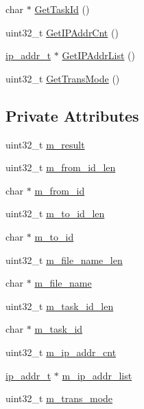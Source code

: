 \begin{DoxyCompactItemize}
\item 
char $\ast$ \hyperlink{class_c_im_pdu_client_file_response_a804f93cce58a8adc167049a30ffba377}{Get\+Task\+Id} ()
\item 
uint32\+\_\+t \hyperlink{class_c_im_pdu_client_file_response_aa64265ca09ef22d7d1e8d11eeb3ebcf6}{Get\+I\+P\+Addr\+Cnt} ()
\item 
\hyperlink{structip__addr__t}{ip\+\_\+addr\+\_\+t} $\ast$ \hyperlink{class_c_im_pdu_client_file_response_aab69ffaf90db3a83eb59c17a97dd725b}{Get\+I\+P\+Addr\+List} ()
\item 
uint32\+\_\+t \hyperlink{class_c_im_pdu_client_file_response_a48c941c039f2b3ac208db121ffa4831f}{Get\+Trans\+Mode} ()
\end{DoxyCompactItemize}
\subsection*{Private Attributes}
\begin{DoxyCompactItemize}
\item 
uint32\+\_\+t \hyperlink{class_c_im_pdu_client_file_response_a1ce5ec6b07086e4d8d725ab185188ec3}{m\+\_\+result}
\item 
uint32\+\_\+t \hyperlink{class_c_im_pdu_client_file_response_a00b534a883b0a19a6483a85ab091b872}{m\+\_\+from\+\_\+id\+\_\+len}
\item 
char $\ast$ \hyperlink{class_c_im_pdu_client_file_response_ae57497bb419857e27435597c7b3956e8}{m\+\_\+from\+\_\+id}
\item 
uint32\+\_\+t \hyperlink{class_c_im_pdu_client_file_response_ad1de68e049e316401d00a5436f41e200}{m\+\_\+to\+\_\+id\+\_\+len}
\item 
char $\ast$ \hyperlink{class_c_im_pdu_client_file_response_a4d6dc367e65513f0644892ef665c4cdd}{m\+\_\+to\+\_\+id}
\item 
uint32\+\_\+t \hyperlink{class_c_im_pdu_client_file_response_a9e9b90607ebdb053476c291d194e58e1}{m\+\_\+file\+\_\+name\+\_\+len}
\item 
char $\ast$ \hyperlink{class_c_im_pdu_client_file_response_ada652da5d3b018688408f1439c7db518}{m\+\_\+file\+\_\+name}
\item 
uint32\+\_\+t \hyperlink{class_c_im_pdu_client_file_response_a09192c0f1313f8da922a58434222a610}{m\+\_\+task\+\_\+id\+\_\+len}
\item 
char $\ast$ \hyperlink{class_c_im_pdu_client_file_response_a100dc2bcc148ada34a4791591647b9a3}{m\+\_\+task\+\_\+id}
\item 
uint32\+\_\+t \hyperlink{class_c_im_pdu_client_file_response_afea9716dd470cf7c87a139a31b729567}{m\+\_\+ip\+\_\+addr\+\_\+cnt}
\item 
\hyperlink{structip__addr__t}{ip\+\_\+addr\+\_\+t} $\ast$ \hyperlink{class_c_im_pdu_client_file_response_a9287488bd64988c341707bcb9d09583c}{m\+\_\+ip\+\_\+addr\+\_\+list}
\item 
uint32\+\_\+t \hyperlink{class_c_im_pdu_client_file_response_abced7aea7c136b70fbd3e4c431b1a518}{m\+\_\+trans\+\_\+mode}
\end{DoxyCompactItemize}
